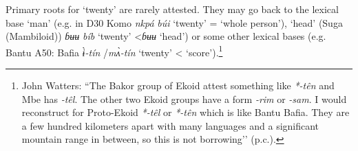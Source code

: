 Primary roots for `twenty' are rarely attested. They may go back to the lexical base `man' (e.g. in D30 Komo \textit{nkpá} \textit{búi} ‘twenty’ = ‘whole person’), `head' (Suga (Mambiloid)) \textit{ɓʉʉ} \textit{bíb} ‘twenty’ <\textit{ɓʉʉ} ‘head’) or some other lexical bases (e.g. Bantu A50: Bafia \textit{{\`{ɨ}}-tín} /\textit{m{\`{ʌ}}-tín} ‘twenty’ < `score').\footnote{John Watters: “The Bakor group of Ekoid attest something like \textit{*-t{\^{e}}n} and Mbe has \textit{-t{\^{e}}l}. The other two Ekoid groups have a form \textit{-rim} or \textit{-sam}. I would reconstruct for Proto-Ekoid \textit{*-t{\^{e}}l} or \textit{*-t{\^{e}}n} which is like Bantu Bafia. They are a few hundred kilometers apart with many languages and a significant mountain range in between, so this is not borrowing’’ (p.c.).} 

 
